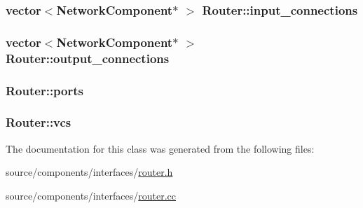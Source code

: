 \hypertarget{classRouter_31d7125efdcf288bfc1627ddba9dcb15}{
\subsubsection[{input\_\-connections}]{\setlength{\rightskip}{0pt plus 5cm}vector$<${\bf NetworkComponent}$\ast$ $>$ {\bf Router::input\_\-connections}}}
\label{classRouter_31d7125efdcf288bfc1627ddba9dcb15}


\hypertarget{classRouter_2da504d3b4c98ee90964c9367f7f0ad3}{
\subsubsection[{output\_\-connections}]{\setlength{\rightskip}{0pt plus 5cm}vector$<${\bf NetworkComponent}$\ast$ $>$ {\bf Router::output\_\-connections}}}
\label{classRouter_2da504d3b4c98ee90964c9367f7f0ad3}


\hypertarget{classRouter_fd8e8adaf03e17b3fdbf7adc758c8f48}{
\subsubsection[{ports}]{ {\bf Router::ports}}}
\label{classRouter_fd8e8adaf03e17b3fdbf7adc758c8f48}


\hypertarget{classRouter_ebaf2bc63bd99effe6520f9718120a1e}{
\subsubsection[{vcs}]{ {\bf Router::vcs}}}
\label{classRouter_ebaf2bc63bd99effe6520f9718120a1e}




The documentation for this class was generated from the following files:\begin{CompactItemize}
\item 
source/components/interfaces/\hyperlink{router_8h}{router.h}\item 
source/components/interfaces/\hyperlink{router_8cc}{router.cc}\end{CompactItemize}

